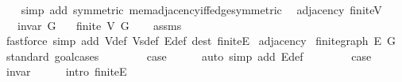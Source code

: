\begin{isabellebody}
%
\isadelimproof
\ \ %
\endisadelimproof
%
\isatagproof
{}\isamarkupfalse%
\ {\isacharparenleft}{\kern0pt}simp\ add{\isacharcolon}{\kern0pt}\ symmetric\ mem{\isacharunderscore}{\kern0pt}adjacency{\isacharunderscore}{\kern0pt}iff{\isacharunderscore}{\kern0pt}edge{\isacharbrackleft}{\kern0pt}symmetric{\isacharbrackright}{\kern0pt}{\isacharparenright}{\kern0pt}%
\endisatagproof
{\isafoldproof}%
%
\isadelimproof
\isanewline
%
\endisadelimproof
\isanewline
{}\isamarkupfalse%
\ {\isacharparenleft}{\kern0pt}\ adjacency{\isacharparenright}{\kern0pt}\ finite{\isacharunderscore}{\kern0pt}V{\isacharcolon}{\kern0pt}\isanewline
\ \ \ {\isachardoublequoteopen}invar\ G{\isachardoublequoteclose}\isanewline
\ \ \ {\isachardoublequoteopen}finite\ {\isacharparenleft}{\kern0pt}V\ G{\isacharparenright}{\kern0pt}{\isachardoublequoteclose}\isanewline
%
\isadelimproof
\ \ %
\endisadelimproof
%
\isatagproof
{}\isamarkupfalse%
\ assms\isanewline
\ \ \isamarkupfalse%
\ {\isacharparenleft}{\kern0pt}fastforce\ simp\ add{\isacharcolon}{\kern0pt}\ V{\isacharunderscore}{\kern0pt}def\ Vs{\isacharunderscore}{\kern0pt}def\ E{\isacharunderscore}{\kern0pt}def\ dest{\isacharcolon}{\kern0pt}\ finite{\isacharunderscore}{\kern0pt}E{\isacharparenright}{\kern0pt}%
\endisatagproof
{\isafoldproof}%
%
\isadelimproof
\isanewline
%
\endisadelimproof
\isanewline
{}\isamarkupfalse%
\ adjacency{\isacharprime}{\kern0pt}\isanewline
{}\isanewline
{}\isamarkupfalse%
\ finite{\isacharunderscore}{\kern0pt}graph\ {\isachardoublequoteopen}E\ G{\isachardoublequoteclose}\isanewline
%
\isadelimproof
%
\endisadelimproof
%
\isatagproof
{}\isamarkupfalse%
\ {\isacharparenleft}{\kern0pt}standard{\isacharcomma}{\kern0pt}\ goal{\isacharunderscore}{\kern0pt}cases{\isacharparenright}{\kern0pt}\isanewline
\ \ \isamarkupfalse%
\ {}\isanewline
\ \ \isamarkupfalse%
\ {\isacharquery}{\kern0pt}case\isanewline
\ \ \ \ \isamarkupfalse%
\ {\isacharparenleft}{\kern0pt}auto\ simp\ add{\isacharcolon}{\kern0pt}\ E{\isacharunderscore}{\kern0pt}def{\isacharparenright}{\kern0pt}\isanewline
{}\isamarkupfalse%
\isanewline
\ \ \isamarkupfalse%
\ {}\isanewline
\ \ \isamarkupfalse%
\ {\isacharquery}{\kern0pt}case\isanewline
\ \ \ \ \isamarkupfalse%
\ invar\isanewline
\ \ \ \ \isamarkupfalse%
\ {\isacharparenleft}{\kern0pt}intro\ finite{\isacharunderscore}{\kern0pt}E{\isacharparenright}{\kern0pt}\isanewline

\end{isabellebody}
